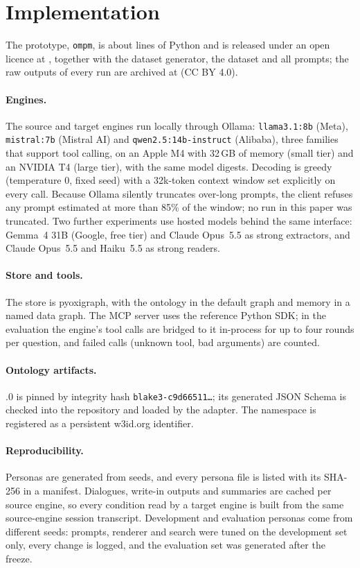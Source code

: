 \section{Implementation}\label{sec:implementation}

The prototype, \texttt{ompm}, is about  lines of Python and is released under an open
licence at \repo, together with the dataset generator, the dataset and all prompts; the raw
outputs of every run are archived at \runsdoi (CC BY 4.0).

\paragraph{Engines.} The source and target engines run locally through Ollama:
\texttt{llama3.1:8b} (Meta), \texttt{mistral:7b} (Mistral AI) and \texttt{qwen2.5:14b-instruct}
(Alibaba), three families that support tool calling, on an Apple M4 with 32\,GB of memory (small
tier) and an NVIDIA T4 (large tier), with the same model digests. Decoding is greedy
(temperature 0, fixed seed) with a 32k-token context window set explicitly on every call. Because
Ollama silently truncates over-long prompts, the client refuses any prompt estimated at more than
85\% of the window; no run in this paper was truncated. Two further experiments use hosted models
behind the same interface: Gemma~4 31B (Google, free tier) and Claude Opus~5.5 as strong extractors, and Claude
Opus~5.5 and Haiku~5.5 as strong readers.

\paragraph{Store and tools.} The store is pyoxigraph, with the ontology in the default graph and
memory in a named data graph. The MCP server uses the reference Python SDK; in the evaluation the
engine's tool calls are bridged to it in-process for up to four rounds per question, and failed
calls (unknown tool, bad arguments) are counted.

\paragraph{Ontology artifacts.} .0 is pinned by integrity hash
\texttt{blake3-c9d66511\ldots}; its generated JSON Schema is checked into the repository and
loaded by the adapter. The
namespace \memns is registered as a persistent w3id.org identifier.

\paragraph{Reproducibility.} Personas are generated from seeds, and every persona file is listed
with its SHA-256 in a manifest. Dialogues, write-in outputs and summaries are cached per source
engine, so every condition read by a target engine is built from the same source-engine session
transcript. Development and evaluation personas come from different seeds: prompts, renderer and
search were tuned on the development set only, every change is logged, and the evaluation set was
generated after the freeze.
